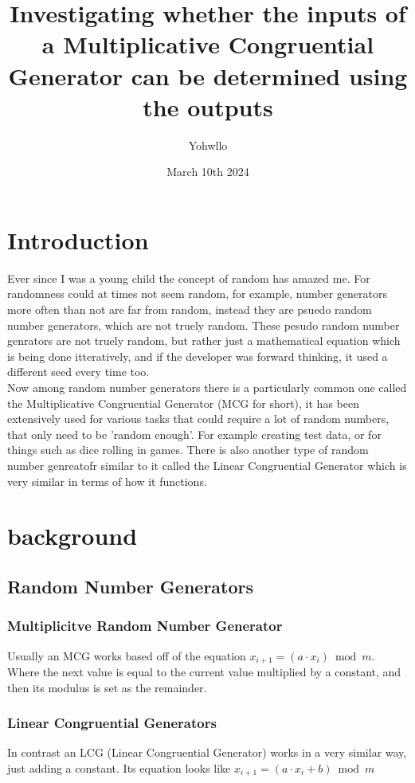 \documentclass[12pft, english]{article}
\title{Investigating whether the inputs of a Multiplicative Congruential Generator can be determined using the outputs}
\author{Yohwllo}
\date{March 10th 2024}
\begin{document}
\maketitle

\tableofcontents
\pagebreak

\begin{multicols}{2}
  \section{Introduction}
  Ever since I was a young child the concept of random has amazed me. For randomness could at times not seem random, for example, number generators more often than not are far from random, instead they are psuedo random number generators, which are not truely random. These pesudo random number genrators are not truely random, but rather just a mathematical equation which is being done itteratively, and if the developer was forward thinking, it used a different seed every time too. \\
  Now among random number generators there is a particularly common one called the Multiplicative Congruential Generator (MCG for short), it has been extensively used for various tasks that could require a lot of random numbers, that only need to be 'random enough'. For example creating test data, or for things such as dice rolling in games. There is also another type of random number genreatofr similar to it called the Linear Congruential Generator which is very similar in terms of how it functions.

  \section{background}
  \subsection{Random Number Generators}
  \subsubsection{Multiplicitve Random Number Generator}
  Usually an MCG works based off of the equation \(x_{i+1} = (a \cdot x_{i}) \bmod m\). Where the next value is equal to the current value multiplied by a constant, and then its modulus is set as the remainder. \citep{waterlooMCG} \citep{fallOntoPlanes}
  \subsubsection{Linear Congruential Generators}
  In contrast an LCG (Linear Congruential Generator) works in a very similar way, just adding a constant. Its equation looks like \(x_{i+1} = (a \cdot x_{i} +b ) \bmod m\) \citep{waterlooMCG}

\end{multicols}
\end{document}
